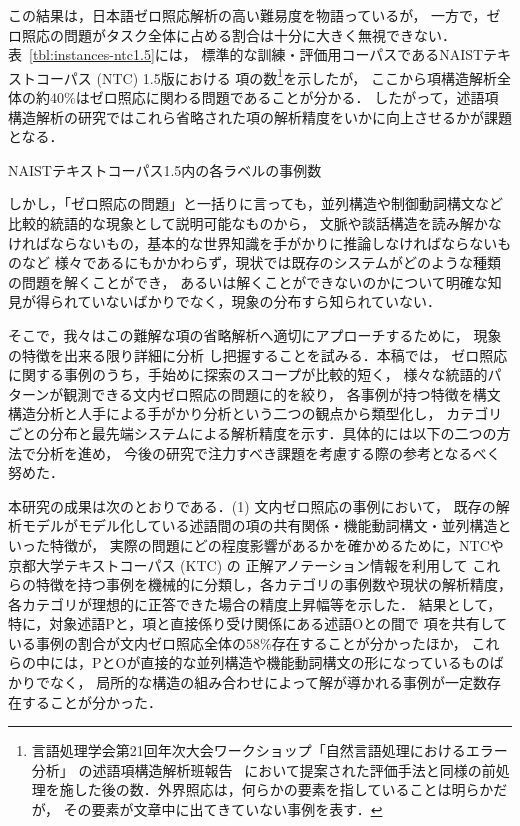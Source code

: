 \documentclass[japanese]{jnlp_1.4}
\begin{document}
この結果は，日本語ゼロ照応解析の高い難易度を物語っているが，
一方で，ゼロ照応の問題がタスク全体に占める割合は十分に大きく無視できない．
表~\ref{tbl:instances-ntc1.5}には，
標準的な訓練・評価用コーパスであるNAISTテキストコーパス (NTC) 1.5版における
項の数\footnote{言語処理学会第21回年次大会ワークショップ「自然言語処理におけるエラー分析」\cite{eaws-2015}
の述語項構造解析班報告~\cite{eaws-pas-2015}
において提案された評価手法と同様の前処理を施した後の数．外界照応は，何らかの要素を指していることは明らかだが，
その要素が文章中に出てきていない事例を表す．}を示したが，
ここから項構造解析全体の約$40\%$はゼロ照応に関わる問題であることが分かる．
したがって，述語項構造解析の研究ではこれら省略された項の解析精度をいかに向上させるかが課題となる．

\begin{table}[b]
\caption{NAISTテキストコーパス1.5内の各ラベルの事例数}
\label{tbl:instances-ntc1.5}

\end{table}

しかし，「ゼロ照応の問題」と一括りに言っても，並列構造や制御動詞構文など比較的統語的な現象として説明可能なものから，
文脈や談話構造を読み解かなければならないもの，基本的な世界知識を手がかりに推論しなければならないものなど
様々であるにもかかわらず，現状では既存のシステムがどのような種類の問題を解くことができ，
あるいは解くことができないのかについて明確な知見が得られていないばかりでなく，現象の分布すら知られていない．

そこで，我々はこの難解な項の省略解析へ適切にアプローチするために，
現象の特徴を出来る限り詳細に分析
し把握することを試みる．本稿では，
ゼロ照応に関する事例のうち，手始めに探索のスコープが比較的短く，
様々な統語的パターンが観測できる文内ゼロ照応の問題に的を絞り，
各事例が持つ特徴を構文構造分析と人手による手がかり分析という二つの観点から類型化し，
カテゴリごとの分布と最先端システムによる解析精度を示す．具体的には以下の二つの方法で分析を進め，
今後の研究で注力すべき課題を考慮する際の参考となるべく努めた．

本研究の成果は次のとおりである．(1) 文内ゼロ照応の事例において，
既存の解析モデルがモデル化している述語間の項の共有関係・機能動詞構文・並列構造といった特徴が，
実際の問題にどの程度影響があるかを確かめるために，NTCや京都大学テキストコーパス (KTC) の
正解アノテーション情報を利用して
これらの特徴を持つ事例を機械的に分類し，各カテゴリの事例数や現状の解析精度，
各カテゴリが理想的に正答できた場合の精度上昇幅等を示した．
結果として，特に，対象述語Pと，項と直接係り受け関係にある述語Oとの間で
項を共有している事例の割合が文内ゼロ照応全体の$58\%$存在することが分かったほか，
これらの中には，PとOが直接的な並列構造や機能動詞構文の形になっているものばかりでなく，
局所的な構造の組み合わせによって解が導かれる事例が一定数存在することが分かった．
\end{document}

